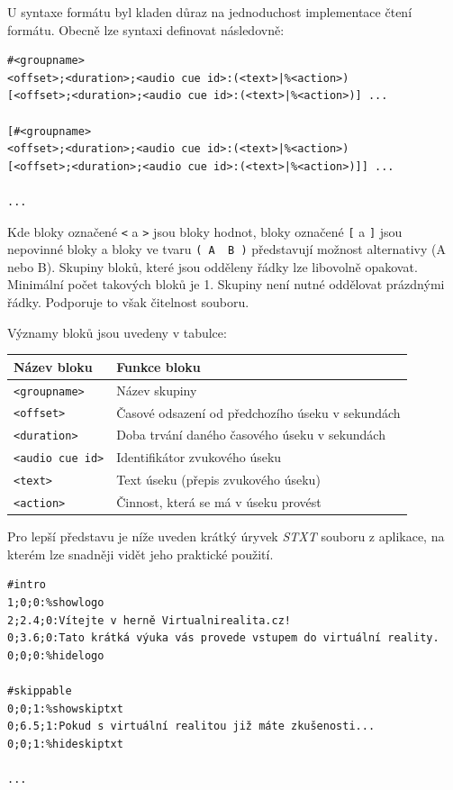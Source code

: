 U syntaxe formátu byl kladen důraz na jednoduchost implementace čtení
formátu. Obecně lze syntaxi definovat následovně:

\begin{verbatim}
#<groupname>
<offset>;<duration>;<audio cue id>:(<text>|%<action>)
[<offset>;<duration>;<audio cue id>:(<text>|%<action>)] ...

[#<groupname>
<offset>;<duration>;<audio cue id>:(<text>|%<action>)
[<offset>;<duration>;<audio cue id>:(<text>|%<action>)]] ...

...
\end{verbatim}

Kde bloky označené \texttt{\textless{}} a \texttt{\textgreater{}} jsou
bloky hodnot, bloky označené \texttt{{[}} a \texttt{{]}} jsou nepovinné
bloky a bloky ve tvaru \texttt{(\ A\ \textbar{}\ B\ )} představují
možnost alternativy (A nebo B). Skupiny bloků, které jsou odděleny řádky
lze libovolně opakovat. Minimální počet takových bloků je 1. Skupiny
není nutné oddělovat prázdnými řádky. Podporuje to však čitelnost souboru.

\newpage

Významy bloků jsou uvedeny v tabulce:

\begin{longtabu}{XX}
\toprule
Název bloku & Funkce bloku\tabularnewline
\midrule
\endhead
\texttt{\textless{}groupname\textgreater{}} & Název
skupiny\tabularnewline
\texttt{\textless{}offset\textgreater{}} & Časové odsazení od
předchozího úseku v sekundách\tabularnewline
\texttt{\textless{}duration\textgreater{}} & Doba trvání daného časového
úseku v sekundách\tabularnewline
\texttt{\textless{}audio\ cue\ id\textgreater{}} & Identifikátor
zvukového úseku\tabularnewline
\texttt{\textless{}text\textgreater{}} & Text úseku (přepis zvukového
úseku)\tabularnewline
\texttt{\textless{}action\textgreater{}} & Činnost, která se má v úseku
provést\tabularnewline
\bottomrule
\end{longtabu}

Pro lepší představu je níže uveden krátký úryvek \emph{STXT} souboru z
aplikace, na kterém lze snadněji vidět jeho praktické použití.

\begin{verbatim}
#intro
1;0;0:%showlogo
2;2.4;0:Vítejte v herně Virtualnirealita.cz!
0;3.6;0:Tato krátká výuka vás provede vstupem do virtuální reality.
0;0;0:%hidelogo

#skippable
0;0;1:%showskiptxt
0;6.5;1:Pokud s virtuální realitou již máte zkušenosti...
0;0;1:%hideskiptxt

...
\end{verbatim}

